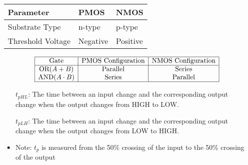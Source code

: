 \documentclass[8pt]{article}
\begin{document}
\begin{table}[h]
  \centering
  \begin{tabular}{|l|l|l|}
    \hline
    \textbf{Parameter} & \textbf{PMOS} & \textbf{NMOS} \\
    \hline
    Substrate Type     & n-type        & p-type        \\
    Threshold Voltage  & Negative      & Positive      \\
    \hline
  \end{tabular}
\end{table}

\[
  \begin{array}{|c|c|c|}
    \hline
    \text{Gate}            & \text{PMOS Configuration} & \text{NMOS Configuration} \\
    \hline
    \text{OR} (A + B)      & \text{Parallel}           & \text{Series}             \\
    \text{AND} (A \cdot B) & \text{Series}             & \text{Parallel}           \\
    \hline
  \end{array}
\]




\begin{itemize}
  \item[$t_{pHL}$:] The time between an input change and the corresponding output change
        when the output changes from HIGH to LOW.
  \item[$t_{pLH}$:] The time between an input change and the corresponding output change
        when the output changes from LOW to HIGH.
  \item Note: $t_p$ is measured from the 50\% crossing
        of the input to the 50\% crossing of the output
\end{itemize}

\end{document}
